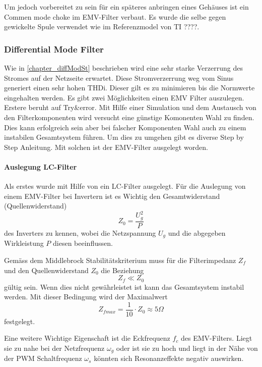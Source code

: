 Um jedoch vorbereitet zu sein für ein späteres anbringen eines Gehäuses ist ein Commen mode choke im EMV-Filter verbaut. 
Es wurde die selbe gegen gewickelte Spule verwendet wie im Referenzmodel von TI ????.

\subsubsection{Differential Mode Filter}
Wie in \ref{chapter_diffModSt} beschrieben wird eine sehr starke Verzerrung des Stromes auf der Netzseite erwartet.
Diese Stromverzerrung weg vom Sinus generiert einen sehr hohen THDi.
Dieser gilt es zu minimieren bis die Normwerte eingehalten werden.
Es gibt zwei Möglichkeiten einen EMV Filter auszulegen. 
Erstere beruht auf Try\&error.  
Mit Hilfe einer Simulation und dem Austausch von den Filterkomponenten wird versucht eine günstige Komonenten Wahl zu finden. Dies kann erfolgreich sein aber bei falscher Komponenten Wahl auch zu einem instabilen Gesamtsystem führen.
Um dies zu umgehen gibt es diverse Step by Step Anleitung.
Mit solchen ist der EMV-Filter ausgelegt worden. 

\paragraph{Auslegung LC-Filter }
Als erstes wurde mit Hilfe von \cite{birichaEMC} ein LC-Filter ausgelegt.
Für die Auslegung von einem EMV-Filter bei Invertern ist es Wichtig den Gesamtwiderstand (Quellenwiderstand) 
\begin{equation}
Z_0=\frac{U_g^2}{P}
\end{equation}
des Inverters zu kennen, wobei die Netzspannung $U_g$ und die abgegeben Wirkleistung $P$ diesen beeinflussen.

Gemäss dem Middlebrock Stabilitätskriterium
muss für die Filterimpedanz $Z_f$ und den Quellenwiderstand $Z_0$ die Beziehung
\[
Z_f \ll Z_0
\]
gültig sein.
Wenn dies nicht gewährleistet ist kann das  Gesamtsystem instabil werden. Mit dieser Bedingung wird der Maximalwert
\begin{equation}
Z_{fmax} = \dfrac{1}{10}\cdot Z_0 \approx 5\Omega
\label{Zfmax}
\end{equation}
festgelegt.

Eine weitere Wichtige Eigenschaft ist die Eckfrequenz $f_c$ des EMV-Filters. Liegt sie zu nahe bei der Netzfrequenz $\omega_g$ oder ist sie zu hoch und liegt in der Nähe von der PWM Schaltfrequenz $\omega_s$ könnten sich Resonanzeffekte negativ auswirken. 

